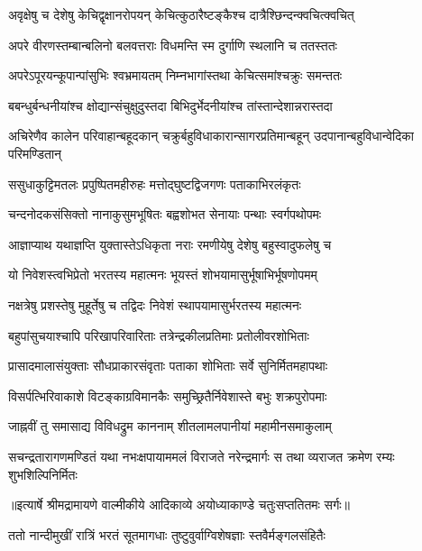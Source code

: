 \twolineshloka
{अवृक्षेषु च देशेषु केचिद्वृक्षानरोपयन्}
{केचित्कुठारैष्टङ्कैश्च दात्रैश्छिन्दन्क्वचित्क्वचित्} %

\twolineshloka
{अपरे वीरणस्तम्बान्बलिनो बलवत्तराः}
{विधमन्ति स्म दुर्गाणि स्थलानि च ततस्ततः} %

\twolineshloka
{अपरेऽपूरयन्कूपान्पांसुभिः श्वभ्रमायतम्}
{निम्नभागांस्तथा केचित्समांश्चक्रुः समन्ततः} %

\twolineshloka
{बबन्धुर्बन्धनीयांश्च क्षोद्यान्संचुक्षुदुस्तदा}
{बिभिदुर्भेदनीयांश्च तांस्तान्देशान्नरास्तदा} %

\threelineshloka
{अचिरेणैव कालेन परिवाहान्बहूदकान्}
{चक्रुर्बहुविधाकारान्सागरप्रतिमान्बहून्}
{उदपानान्बहुविधान्वेदिका परिमण्डितान्} %

\twolineshloka
{ससुधाकुट्टिमतलः प्रपुष्पितमहीरुहः}
{मत्तोद्घुष्टद्विजगणः पताकाभिरलंकृतः} %

\twolineshloka
{चन्दनोदकसंसिक्तो नानाकुसुमभूषितः}
{बह्वशोभत सेनायाः पन्थाः स्वर्गपथोपमः} %

\twolineshloka
{आज्ञाप्याथ यथाज्ञप्ति युक्तास्तेऽधिकृता नराः}
{रमणीयेषु देशेषु बहुस्वादुफलेषु च} %

\twolineshloka
{यो निवेशस्त्वभिप्रेतो भरतस्य महात्मनः}
{भूयस्तं शोभयामासुर्भूषाभिर्भूषणोपमम्} %

\twolineshloka
{नक्षत्रेषु प्रशस्तेषु मुहूर्तेषु च तद्विदः}
{निवेशं स्थापयामासुर्भरतस्य महात्मनः} %

\twolineshloka
{बहुपांसुचयाश्चापि परिखापरिवारिताः}
{तत्रेन्द्रकीलप्रतिमाः प्रतोलीवरशोभिताः} %

\twolineshloka
{प्रासादमालासंयुक्ताः सौधप्राकारसंवृताः}
{पताका शोभिताः सर्वे सुनिर्मितमहापथाः} %

\twolineshloka
{विसर्पत्भिरिवाकाशे विटङ्काग्रविमानकैः}
{समुच्छ्रितैर्निवेशास्ते बभुः शक्रपुरोपमाः} %

\twolineshloka
{जाह्नवीं तु समासाद्य विविधद्रुम काननाम्}
{शीतलामलपानीयां महामीनसमाकुलाम्} %

\fourlineindentedshloka
{सचन्द्रतारागणमण्डितं यथा}
{ नभःक्षपायाममलं विराजते}
{नरेन्द्रमार्गः स तथा व्यराजत}
{ क्रमेण रम्यः शुभशिल्पिनिर्मितः} %


{॥इत्यार्षे श्रीमद्रामायणे वाल्मीकीये आदिकाव्ये अयोध्याकाण्डे चतुःसप्ततितमः सर्गः॥}


\twolineshloka
{ततो नान्दीमुखीं रात्रिं भरतं सूतमागधाः}
{तुष्टुवुर्वाग्विशेषज्ञाः स्तवैर्मङ्गलसंहितैः} %

